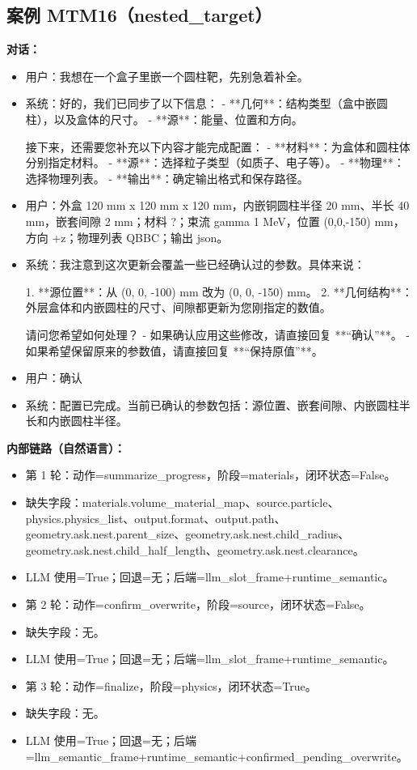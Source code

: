 \documentclass[11pt]{ctexart}
\begin{document}
\subsection{案例 MTM16（nested\_target）}
\textbf{对话：}
\begin{itemize}
\item 用户：我想在一个盒子里嵌一个圆柱靶，先别急着补全。
\item 系统：好的，我们已同步了以下信息：
- **几何**：结构类型（盒中嵌圆柱），以及盒体的尺寸。
- **源**：能量、位置和方向。

接下来，还需要您补充以下内容才能完成配置：
- **材料**：为盒体和圆柱体分别指定材料。
- **源**：选择粒子类型（如质子、电子等）。
- **物理**：选择物理列表。
- **输出**：确定输出格式和保存路径。
\item 用户：外盒 120 mm x 120 mm x 120 mm，内嵌铜圆柱半径 20 mm、半长 40 mm，嵌套间隙 2 mm；材料 ?；束流 gamma 1 MeV，位置 (0,0,-150) mm，方向 +z；物理列表 QBBC；输出 json。
\item 系统：我注意到这次更新会覆盖一些已经确认过的参数。具体来说：

1.  **源位置**：从 (0, 0, -100) mm 改为 (0, 0, -150) mm。
2.  **几何结构**：外层盒体和内嵌圆柱的尺寸、间隙都更新为您刚指定的数值。

请问您希望如何处理？
- 如果确认应用这些修改，请直接回复 **“确认”**。
- 如果希望保留原来的参数值，请直接回复 **“保持原值”**。
\item 用户：确认
\item 系统：配置已完成。当前已确认的参数包括：源位置、嵌套间隙、内嵌圆柱半长和内嵌圆柱半径。
\end{itemize}
\textbf{内部链路（自然语言）：}
\begin{itemize}
\item 第 1 轮：动作=summarize\_progress，阶段=materials，闭环状态=False。
\item 缺失字段：materials.volume\_material\_map、source.particle、physics.physics\_list、output.format、output.path、geometry.ask.nest.parent\_size、geometry.ask.nest.child\_radius、geometry.ask.nest.child\_half\_length、geometry.ask.nest.clearance。
\item LLM 使用=True；回退=无；后端=llm\_slot\_frame+runtime\_semantic。
\item 第 2 轮：动作=confirm\_overwrite，阶段=source，闭环状态=False。
\item 缺失字段：无。
\item LLM 使用=True；回退=无；后端=llm\_slot\_frame+runtime\_semantic。
\item 第 3 轮：动作=finalize，阶段=physics，闭环状态=True。
\item 缺失字段：无。
\item LLM 使用=True；回退=无；后端=llm\_semantic\_frame+runtime\_semantic+confirmed\_pending\_overwrite。
\end{itemize}
\end{document}
